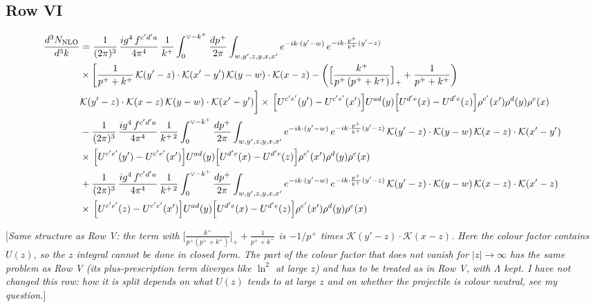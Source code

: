 \documentclass[9pt]{article}
\numberwithin{equation}{section}
\newcommand{\rnote}[1]{{\color{teal}[\textit{#1}]}}
\begin{document}
\subsection{Row VI}
\begin{align}
\frac{d^{3}N_{\rm NLO}}{d^{3}k}&=\frac{1}{(2\pi)^{3}}\,\frac{ig^{4}\,f^{c^{\prime}d^{\prime}a}}{4\pi^{4}}\,\frac{1}{k^{+}}\int_{0}^{\vee-k^{+}}\frac{dp^{+}}{2\pi}\int_{w,y^{\prime},z,y,x,x^{\prime}}e^{-ik\cdot(y^{\prime}-w)}\,e^{-ik\cdot\frac{p^{+}}{k^{+}}(y^{\prime}-z)}\notag\\&\times\bigg[\frac{1}{p^{+}+k^{+}}\,\mathcal{K}(y^{\prime}-z)\cdot\mathcal{K}(x^{\prime}-y^{\prime})\,\mathcal{K}(y-w)\cdot\mathcal{K}(x-z)-\bigg(\Big[\frac{k^{+}}{p^{+}\,(p^{+}+k^{+})}\Big]_{+}+\frac{1}{p^{+}+k^{+}}\bigg)\notag \\ & \mathcal{K}(y^{\prime}-z)\cdot\mathcal{K}(x-z)\,\mathcal{K}(y-w)\cdot\mathcal{K}(x^{\prime}-y^{\prime})\bigg]\times\,\Big[U^{c^{\prime}e^{\prime}}(y^{\prime})-U^{c^{\prime}e^{\prime}}(x^{\prime})\Big]U^{ad}(y)\Big[U^{d^{\prime}e}(x)-U^{d^{\prime}e}(z)\Big]\rho^{e^{\prime}}(x^{\prime})\rho^{d}(y)\rho^{e}(x)\notag\\&-\frac{1}{(2\pi)^{3}}\,\frac{ig^{4}\,f^{c^{\prime}d^{\prime}a}}{4\pi^{4}}\,\frac{1}{k^{+\,2}}\int_{0}^{\vee-k^{+}}\frac{dp^{+}}{2\pi}\int_{w,y^{\prime},z,y,x,x^{\prime}}e^{-ik\cdot(y^{\prime}-w)}\,e^{-ik\cdot\frac{p^{+}}{k^{+}}(y^{\prime}-z)}\,\mathcal{K}(y^{\prime}-z)\cdot\mathcal{K}(y-w)\,\mathcal{K}(x-z)\cdot\mathcal{K}(x^{\prime}-y^{\prime})\notag\\&\times\,\Big[U^{c^{\prime}e^{\prime}}(y^{\prime})-U^{c^{\prime}e^{\prime}}(x^{\prime})\Big]U^{ad}(y)\Big[U^{d^{\prime}e}(x)-U^{d^{\prime}e}(z)\Big]\rho^{e^{\prime}}(x^{\prime})\rho^{d}(y)\rho^{e}(x)\notag\\&+\frac{1}{(2\pi)^{3}}\,\frac{ig^{4}\,f^{c^{\prime}d^{\prime}a}}{4\pi^{4}}\,\frac{1}{k^{+\,2}}\int_{0}^{\vee-k^{+}}\frac{dp^{+}}{2\pi}\int_{w,y^{\prime},z,y,x,x^{\prime}}e^{-ik\cdot(y^{\prime}-w)}\,e^{-ik\cdot\frac{p^{+}}{k^{+}}(y^{\prime}-z)}\,\mathcal{K}(y^{\prime}-z)\cdot\mathcal{K}(y-w)\,\mathcal{K}(x-z)\cdot\mathcal{K}(x^{\prime}-z)\notag\\&\times\,\Big[U^{c^{\prime}e^{\prime}}(z)-U^{c^{\prime}e^{\prime}}(x^{\prime})\Big]U^{ad}(y)\Big[U^{d^{\prime}e}(x)-U^{d^{\prime}e}(z)\Big]\rho^{e^{\prime}}(x^{\prime})\rho^{d}(y)\rho^{e}(x)
\end{align}

\rnote{Same structure as Row V: the term with $\big[\frac{k^{+}}{p^{+}(p^{+}+k^{+})}\big]_{+}+\frac{1}{p^{+}+k^{+}}$ is $-1/p^{+}$ times $\mathcal{K}(y'-z)\cdot\mathcal{K}(x-z)$. Here the colour factor contains $U(z)$, so the $z$ integral cannot be done in closed form. The part of the colour factor that does not vanish for $|z|\to\infty$ has the same problem as Row V (its plus-prescription term diverges like $\ln^{2}$ at large $z$) and has to be treated as in Row V, with $\Lambda$ kept. I have not changed this row: how it is split depends on what $U(z)$ tends to at large $z$ and on whether the projectile is colour neutral, see my question.}
\end{document}
